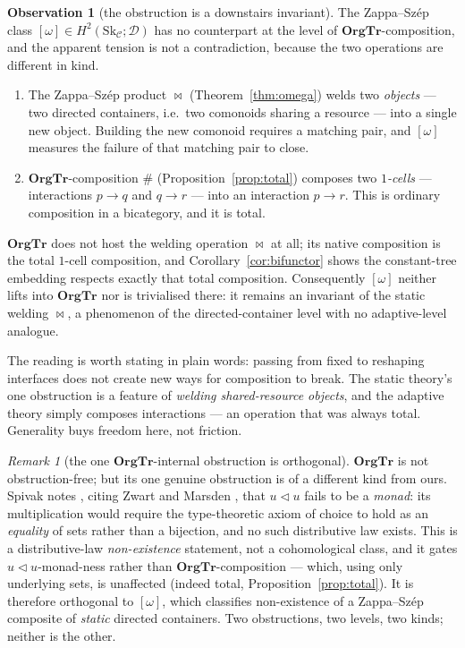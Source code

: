 \documentclass[11pt]{amsart}
\theoremstyle{definition}
\newtheorem{observation}[theorem]{Observation}
\theoremstyle{remark}
\newtheorem{remark}[theorem]{Remark}
\newcommand{\OrgTr}{\mathbf{OrgTr}}
\newcommand{\C}{\mathcal{C}}
\newcommand{\Sk}{\mathrm{Sk}}
\newcommand{\dir}{\mathcal{D}}
\newcommand{\seq}{\triangleleft}
\newcommand{\zs}{\bowtie}
\begin{document}
\begin{observation}[the obstruction is a downstairs invariant]\label{obs:downstairs}
The Zappa--Szép class $[\omega]\in H^2(\Sk_\C;\dir)$ has no counterpart at the level of
$\OrgTr$-composition, and the apparent tension is not a contradiction, because the two
operations are different in kind.
\begin{enumerate}
  \item The Zappa--Szép product $\zs$ (Theorem~\textup{\ref{thm:omega}}) welds two
    \emph{objects} --- two directed containers, i.e.\ two comonoids sharing a resource ---
    into a single new object. Building the new comonoid requires a matching pair, and
    $[\omega]$ measures the failure of that matching pair to close.
  \item $\OrgTr$-composition $\#$ (Proposition~\textup{\ref{prop:total}}) composes two
    \emph{$1$-cells} --- interactions $p\to q$ and $q\to r$ --- into an interaction
    $p\to r$. This is ordinary composition in a bicategory, and it is total.
\end{enumerate}
$\OrgTr$ does not host the welding operation $\zs$ at all; its native composition is the
total $1$-cell composition, and Corollary~\textup{\ref{cor:bifunctor}} shows the
constant-tree embedding respects exactly that total composition. Consequently $[\omega]$
neither lifts into $\OrgTr$ nor is trivialised there: it remains an invariant of the static
welding $\zs$, a phenomenon of the directed-container level with no adaptive-level analogue.
\end{observation}

The reading is worth stating in plain words: passing from fixed to reshaping interfaces does
not create new ways for composition to break. The static theory's one obstruction is a
feature of \emph{welding shared-resource objects}, and the adaptive theory simply composes
interactions --- an operation that was always total. Generality buys freedom here, not
friction.

\begin{remark}[the one $\OrgTr$-internal obstruction is orthogonal]\label{rem:orthogonal}
$\OrgTr$ is not obstruction-free; but its one genuine obstruction is of a different kind
from ours. Spivak notes \cite[Rem.~3.17]{SpivakOrgTr}, citing Zwart and Marsden
\cite{ZwartMarsden}, that $u\seq u$ fails to be a \emph{monad}: its multiplication would
require the type-theoretic axiom of choice to hold as an \emph{equality} of sets rather than
a bijection, and no such distributive law exists. This is a distributive-law
\emph{non-existence} statement, not a cohomological class, and it gates $u\seq u$-monad-ness
rather than $\OrgTr$-composition --- which, using only underlying sets, is unaffected
(indeed total, Proposition~\ref{prop:total}). It is therefore orthogonal to $[\omega]$,
which classifies non-existence of a Zappa--Szép composite of \emph{static} directed
containers. Two obstructions, two levels, two kinds; neither is the other.
\end{remark}
\end{document}
